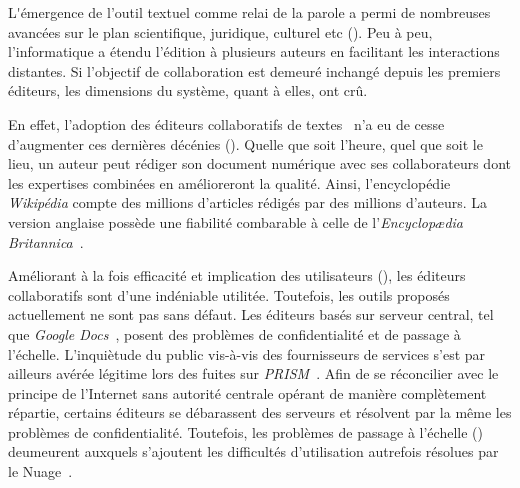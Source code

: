 \lettrine{L}'émergence de l'outil textuel comme relai de la parole a permi de
nombreuses avancées sur le plan scientifique, juridique, culturel etc
(\REF). Peu à peu, l'informatique a étendu l'édition à plusieurs auteurs en
facilitant les interactions distantes. Si l'objectif de collaboration est
demeuré inchangé depuis les premiers éditeurs, les dimensions du système, quant
à elles, ont crû.

En effet, l'adoption des éditeurs collaboratifs de
textes~\cite{ellis1991groupware} n'a eu de cesse d'augmenter ces dernières
décénies (\REF). Quelle que soit l'heure, quel que soit le lieu, un auteur peut
rédiger son document numérique avec ses collaborateurs dont les expertises
combinées en amélioreront la qualité. Ainsi, l'encyclopédie \emph{Wikipédia}
compte des millions d'articles rédigés par des millions d'auteurs. La version
anglaise possède une fiabilité combarable à celle de l'\emph{Encyclop\ae{}dia
  Britannica}~\cite{giles2005internet}.

Améliorant à la fois efficacité et implication des utilisateurs (\REF), les
éditeurs collaboratifs sont d'une indéniable utilitée. Toutefois, les outils
proposés actuellement ne sont pas sans défaut. Les éditeurs basés sur serveur
central, tel que \emph{Google Docs}~\cite{nichols1995high}, posent des problèmes
de confidentialité et de passage à l'échelle. L'inquiètude du public vis-à-vis
des fournisseurs de services s'est par ailleurs avérée légitime lors des fuites
sur \emph{PRISM}~\cite{gellman2013us}. Afin de se réconcilier avec le principe
de l'Internet sans autorité centrale opérant de manière complètement répartie,
certains éditeurs se débarassent des serveurs et résolvent par la même les
problèmes de confidentialité. Toutefois, les problèmes de passage à l'échelle
(\REF) deumeurent auxquels s'ajoutent les difficultés d'utilisation autrefois
résolues par le Nuage~\cite{mell2011national}.



